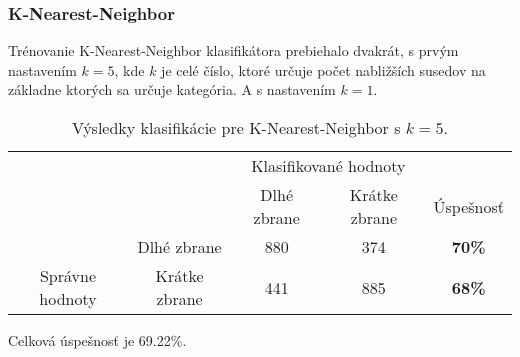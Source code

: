 \subsubsection{K-Nearest-Neighbor}
Trénovanie K-Nearest-Neighbor klasifikátora prebiehalo dvakrát, s prvým nastavením $k=5$, kde $k$ je celé číslo, ktoré určuje
    počet nabližších susedov na základne ktorých sa určuje kategória.
A s nastavením $k=1$.

\begin{table}[H]
    \centering
    \begin{tabular}{ccccc}
                                                                &                                    & \multicolumn{2}{c}{Klasifikované hodnoty}                                                         &                                    \\ \cline{3-5} 
                                                                & \multicolumn{1}{c|}{}              & \multicolumn{1}{c|}{Dlhé zbrane}                & \multicolumn{1}{c|}{Krátke zbrane}              & \multicolumn{1}{c|}{Úspešnosť}     \\ \cline{2-5} 
        \multicolumn{1}{c|}{}                                  & \multicolumn{1}{c|}{Dlhé zbrane}   & \multicolumn{1}{c|}{{\color[HTML]{009901} 880}} & \multicolumn{1}{c|}{{\color[HTML]{9A0000} 374}} & \multicolumn{1}{c|}{\textbf{70\%}} \\ \cline{2-5} 
        \multicolumn{1}{c|}{\multirow{-2}{*}{Správne hodnoty}} & \multicolumn{1}{c|}{Krátke zbrane} & \multicolumn{1}{c|}{{\color[HTML]{9A0000} 441}} & \multicolumn{1}{c|}{{\color[HTML]{009901} 885}} & \multicolumn{1}{c|}{\textbf{68\%}} \\ \cline{2-5} 
    \end{tabular}
    \caption{Výsledky klasifikácie pre K-Nearest-Neighbor s $k=5$.}
    \label{tab:kmeans5}
\end{table}
Celková úspešnosť je 69.22\%.

